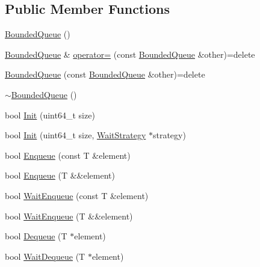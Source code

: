 \subsection*{Public Member Functions}
\begin{DoxyCompactItemize}
\item 
\hyperlink{classapollo_1_1cyber_1_1base_1_1BoundedQueue_adfb504463c84df45f7331b3a5bc0b2dc}{Bounded\-Queue} ()
\item 
\hyperlink{classapollo_1_1cyber_1_1base_1_1BoundedQueue}{Bounded\-Queue} \& \hyperlink{classapollo_1_1cyber_1_1base_1_1BoundedQueue_a58546812b4cf14dcefd0c7cbbb1f1ce7}{operator=} (const \hyperlink{classapollo_1_1cyber_1_1base_1_1BoundedQueue}{Bounded\-Queue} \&other)=delete
\item 
\hyperlink{classapollo_1_1cyber_1_1base_1_1BoundedQueue_a37d3d2f6bb4198183bb50410b1549d9e}{Bounded\-Queue} (const \hyperlink{classapollo_1_1cyber_1_1base_1_1BoundedQueue}{Bounded\-Queue} \&other)=delete
\item 
\hyperlink{classapollo_1_1cyber_1_1base_1_1BoundedQueue_afee156d51ff7a99b632018b323d081ea}{$\sim$\-Bounded\-Queue} ()
\item 
bool \hyperlink{classapollo_1_1cyber_1_1base_1_1BoundedQueue_ab533131fead9b6582000e8e36e25a16a}{Init} (uint64\-\_\-t size)
\item 
bool \hyperlink{classapollo_1_1cyber_1_1base_1_1BoundedQueue_a251cc10b72fdccbdc7afea437268d5aa}{Init} (uint64\-\_\-t size, \hyperlink{classapollo_1_1cyber_1_1base_1_1WaitStrategy}{Wait\-Strategy} $\ast$strategy)
\item 
bool \hyperlink{classapollo_1_1cyber_1_1base_1_1BoundedQueue_acd1f2d44c5ebeede766e1af9035aa9a9}{Enqueue} (const T \&element)
\item 
bool \hyperlink{classapollo_1_1cyber_1_1base_1_1BoundedQueue_afac8fe0282970f47d94cf042f1b0229b}{Enqueue} (T \&\&element)
\item 
bool \hyperlink{classapollo_1_1cyber_1_1base_1_1BoundedQueue_a71e93856645945df2895ce546ecac613}{Wait\-Enqueue} (const T \&element)
\item 
bool \hyperlink{classapollo_1_1cyber_1_1base_1_1BoundedQueue_a564154e9448d98d2843aa5cfc1cf2f5e}{Wait\-Enqueue} (T \&\&element)
\item 
bool \hyperlink{classapollo_1_1cyber_1_1base_1_1BoundedQueue_ade44ba27167b91f52b7247f18ef7f1b4}{Dequeue} (T $\ast$element)
\item 
bool \hyperlink{classapollo_1_1cyber_1_1base_1_1BoundedQueue_ae83724056afdf4033566ec0d9d817717}{Wait\-Dequeue} (T $\ast$element)

\end{DoxyCompactItemize}
